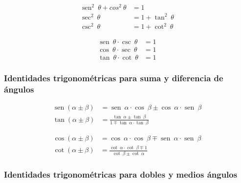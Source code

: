 \documentclass[11pt,letterpaper,oneside]{book}
\numberwithin{equation}{section}
\begin{document}
	\begin{minipage}{0.48\textwidth}
		\begin{align}
			\operatorname{sen}^2 \ \theta + cos^2\ \theta &= 1 \\
			\sec^2 \ \theta &= 1+\tan^2 \ \theta \\
			\csc^2 \ \theta &= 1 + \cot^2 \ \theta
		\end{align}
	\end{minipage}
	\begin{minipage}{0.48\textwidth}
		\begin{align}
			\operatorname{sen} \ \theta \cdot \csc \ \theta &= 1 \\
			\cos \ \theta \cdot \sec \ \theta &= 1 \\
			\tan \ \theta \cdot \cot \ \theta &=1
		\end{align}
	\end{minipage}

	\subsubsection{Identidades trigonométricas para suma y diferencia de ángulos}
	
	\begin{minipage}{0.48\textwidth}
		\begin{align}
			\operatorname{sen}(\alpha \pm \beta) &= \operatorname{sen} \ \alpha \cdot \cos \ \beta \pm \cos \ \alpha \cdot \operatorname{sen} \ \beta \\
			\tan (\alpha \pm \beta) &= \frac{\tan \ \alpha \pm \tan \ \beta}{1 \mp \tan \ \alpha \cdot \tan \ \beta}
		\end{align}
	\end{minipage}
	\begin{minipage}{0.48\textwidth}
		\begin{align}
			\cos (\alpha \pm \beta) &= \cos \ \alpha \cdot \cos \ \beta \mp \operatorname{sen} \ \alpha \cdot \operatorname{sen} \ \beta \\
			\cot (\alpha \pm \beta) &= \frac{\cot \ \alpha \cdot \cot \ \beta \mp 1}{\cot \ \beta \pm \cot \ \alpha}
		\end{align}
	\end{minipage}
			
	\subsubsection{Identidades trigonométricas para dobles y medios ángulos}
	
\end{document}
